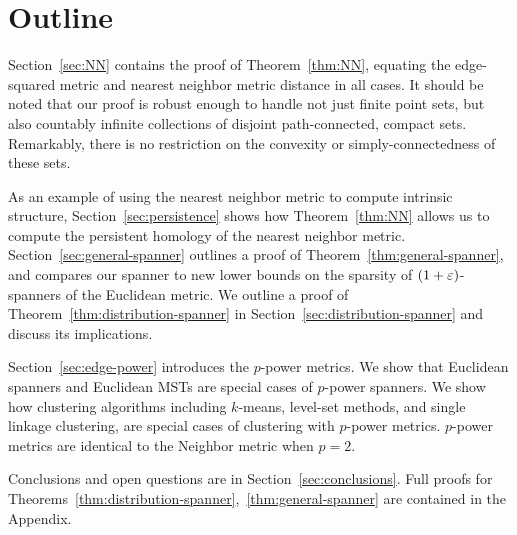 \section{Outline}
%
Section~\ref{sec:NN} contains the proof of Theorem~\ref{thm:NN},
equating the edge-squared metric and nearest neighbor metric distance in
all cases. It should be noted that our proof is robust enough to handle not
just finite point sets, but also countably infinite collections of disjoint
path-connected, compact sets. Remarkably, there is no restriction on the convexity or
simply-connectedness of these sets.

As an example of using the nearest neighbor metric to compute intrinsic structure, Section~\ref{sec:persistence} shows how Theorem~\ref{thm:NN} allows us to compute the persistent homology of the nearest neighbor metric.
Section~\ref{sec:general-spanner} outlines a proof of Theorem~\ref{thm:general-spanner}, and compares our spanner to new lower
bounds
on the sparsity of $(1+\varepsilon)$-spanners of the Euclidean metric.
We outline a proof of Theorem~\ref{thm:distribution-spanner} in
Section~\ref{sec:distribution-spanner} and discuss its implications.

Section~\ref{sec:edge-power} introduces the $p$-power metrics. We show
that Euclidean spanners and Euclidean MSTs are special cases of
$p$-power spanners. We show how
clustering algorithms including $k$-means, level-set methods,
and single linkage clustering, are special cases of
clustering with $p$-power metrics. $p$-power metrics are identical to the
Neighbor metric when $p=2$.


Conclusions and open questions are in
Section~\ref{sec:conclusions}. Full proofs for
Theorems~\ref{thm:distribution-spanner},~\ref{thm:general-spanner}
are contained in the Appendix.
